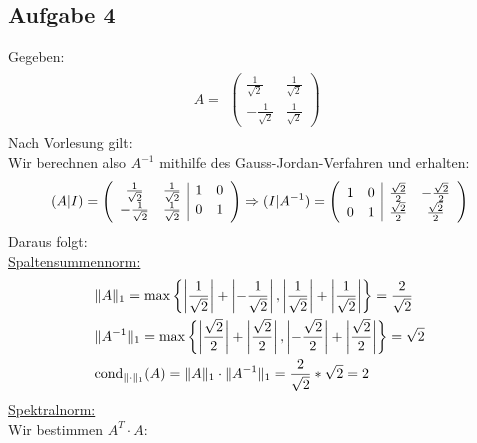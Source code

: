 \newpage
\subsection*{Aufgabe 4}
Gegeben:
\begin{align*} \label{eq8}
A=
\begin{split}
\begin{pmatrix}
\frac{1}{\sqrt2} & \frac{1}{\sqrt2} \\
-\frac{1}{\sqrt2} &\frac{1}{\sqrt2}
\end{pmatrix}
\end{split}
\end{align*}
Nach Vorlesung gilt: \\

Wir berechnen also $A^{-1}$ mithilfe des Gauss-Jordan-Verfahren und erhalten:
\begin{align*}
(A|I)=
\begin{split}
\begin{array}({cc|cc})
\frac{1}{\sqrt2} & \frac{1}{\sqrt2} & 1 & 0 \\
-\frac{1}{\sqrt2} &\frac{1}{\sqrt2} & 0 & 1
\end{array}
\Rightarrow(I|A^{-1})=
\begin{array}({cc|cc})
 1 & 0 & \frac{\sqrt2}{2} & -\frac{\sqrt2}{2} \\
 0 & 1 & \frac{\sqrt2}{2} & \frac{\sqrt2}{2}
\end{array}
\end{split}
\end{align*}
Daraus folgt:\\
\underline{Spaltensummennorm:}
\begin{align*}
\begin{split}
&\|A\|_1=\mathrm{max}\left\lbrace \left|\frac{1}{\sqrt2}\right|+\left|-\frac{1}{\sqrt2}\right|, \left|\frac{1}{\sqrt2}\right|+\left|\frac{1}{\sqrt2}\right|\right\rbrace=\frac{2}{\sqrt2}\\
&\|A^{-1}\|_1=\mathrm{max}\left\lbrace\left|\frac{\sqrt2}{2}\right|+\left|\frac{\sqrt2}{2}\right|, \left|-\frac{\sqrt2}{2}\right|+\left|\frac{\sqrt2}{2}\right|\right\rbrace={\sqrt2}\\
& \mathrm{cond}_{\| \cdot \|_1}(A)=\|A\|_1\cdot\|A^{-1}\|_1=\frac{2}{\sqrt2} * {\sqrt2} = 2\\
\end{split}
\end{align*}
\underline{Spektralnorm:}\\
Wir bestimmen $A^T\cdot A$:\\
